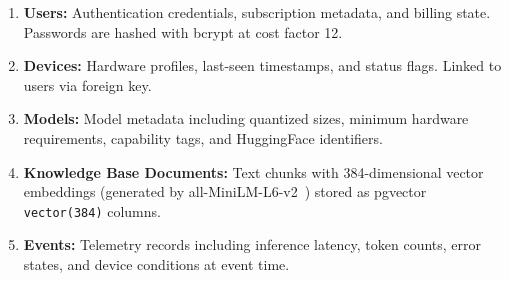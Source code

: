 \documentclass[12pt, letterpaper, twoside]{report}
\begin{document}
\begin{enumerate}[itemsep=3pt]
\item \textbf{Users:} Authentication credentials, subscription metadata, and billing state. Passwords are hashed with bcrypt at cost factor 12.
\item \textbf{Devices:} Hardware profiles, last-seen timestamps, and status flags. Linked to users via foreign key.
\item \textbf{Models:} Model metadata including quantized sizes, minimum hardware requirements, capability tags, and HuggingFace identifiers.
\item \textbf{Knowledge Base Documents:} Text chunks with 384-dimensional vector embeddings (generated by all-MiniLM-L6-v2~\cite{wang2020minilm}) stored as pgvector \texttt{vector\allowbreak(384)} columns.
\item \textbf{Events:} Telemetry records including inference latency, token counts, error states, and device conditions at event time.
\end{enumerate}
\end{document}
